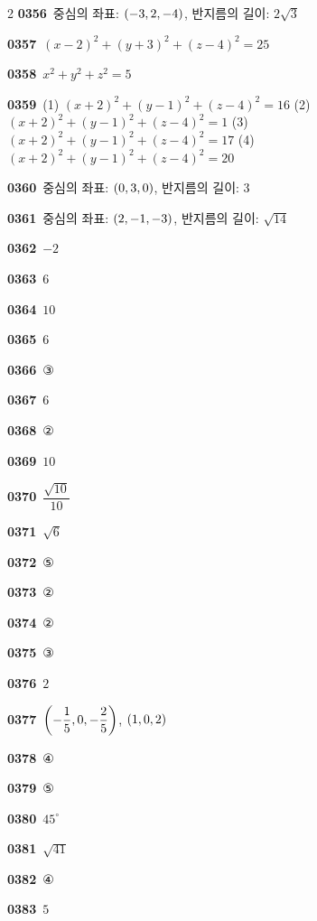 \documentclass[10pt,a4paper]{article}
\begin{document}
\begin{multicols}{2}
\noindent\textbf{0356}\ 중심의 좌표: $(-3{,}\mkern3mu\mathopen{}2{,}\mkern3mu\mathopen{}-4)$, 반지름의 길이: $2\sqrt{3}$\par
\noindent\textbf{0357}\ $(x-2)^2+(y+3)^2+(z-4)^2=25$\par
\noindent\textbf{0358}\ $x^2+y^2+z^2=5$\par
\noindent\textbf{0359}\ (1) $(x+2)^2+(y-1)^2+(z-4)^2=16$ \quad (2) $(x+2)^2+(y-1)^2+(z-4)^2=1$ \quad (3) $(x+2)^2+(y-1)^2+(z-4)^2=17$ \quad (4) $(x+2)^2+(y-1)^2+(z-4)^2=20$\par
\noindent\textbf{0360}\ 중심의 좌표: $(0{,}\mkern3mu\mathopen{}3{,}\mkern3mu\mathopen{}0)$, 반지름의 길이: $3$\par
\noindent\textbf{0361}\ 중심의 좌표: $(2{,}\mkern3mu\mathopen{}-1{,}\mkern3mu\mathopen{}-3)$, 반지름의 길이: $\sqrt{14}$\par
\noindent\textbf{0362}\ $-2$\par
\noindent\textbf{0363}\ $6$\par
\noindent\textbf{0364}\ $10$\par
\noindent\textbf{0365}\ $6$\par
\noindent\textbf{0366}\ ③\par
\noindent\textbf{0367}\ $6$\par
\noindent\textbf{0368}\ ②\par
\noindent\textbf{0369}\ $10$\par
\noindent\textbf{0370}\ $\dfrac{\sqrt{10}}{10}$\par
\noindent\textbf{0371}\ $\sqrt{6}$\par
\noindent\textbf{0372}\ ⑤\par
\noindent\textbf{0373}\ ②\par
\noindent\textbf{0374}\ ②\par
\noindent\textbf{0375}\ ③\par
\noindent\textbf{0376}\ $2$\par
\noindent\textbf{0377}\ $\left(-\dfrac{1}{5}{,}\mkern3mu\mathopen{}0{,}\mkern3mu\mathopen{}-\dfrac{2}{5}\right)$, $(1{,}\mkern3mu\mathopen{}0{,}\mkern3mu\mathopen{}2)$\par
\noindent\textbf{0378}\ ④\par
\noindent\textbf{0379}\ ⑤\par
\noindent\textbf{0380}\ $45^\circ$\par
\noindent\textbf{0381}\ $\sqrt{41}$\par
\noindent\textbf{0382}\ ④\par
\noindent\textbf{0383}\ $5$\par

\end{multicols}
\end{document}
